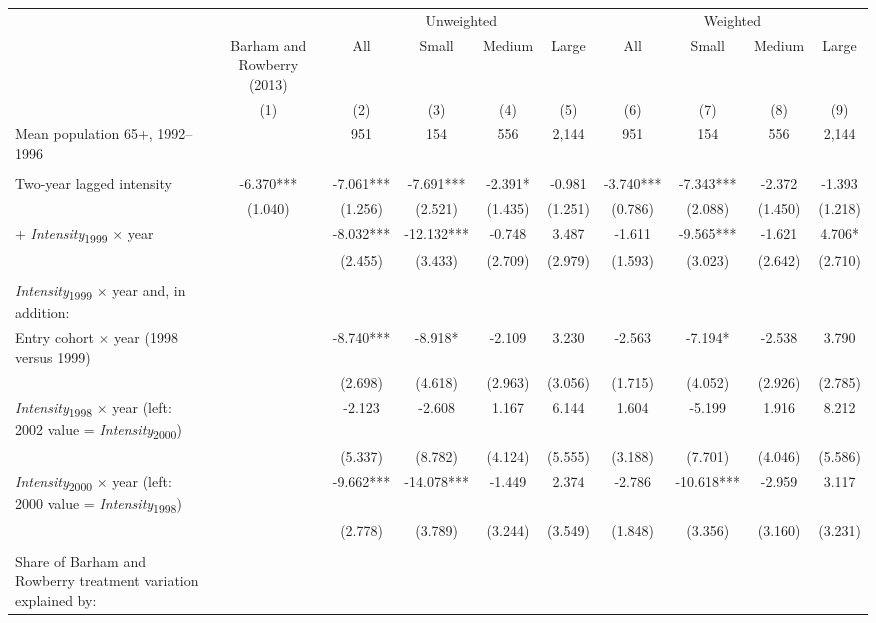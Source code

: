 \begin{tabular}{lccccccccc} \hline \hline
 & & \multicolumn{4}{c}{Unweighted} & \multicolumn{4}{c}{Weighted} \\ \cmidrule(lr){3-6} \cmidrule(lr){7-10}
 & Barham and Rowberry (2013) & All & Small & Medium & Large & All & Small & Medium & Large \\ 
 & (1) & (2) & (3) & (4) & (5) & (6) & (7) & (8) & (9) \\ \toprule
Mean population 65+, 1992--1996 & & 951 & 154 & 556 & 2,144 & 951 & 154 & 556 & 2,144 \\ 
  & & & & & & & & & \\ 
Two-year lagged intensity & -6.370*** & -7.061*** & -7.691*** & -2.391* & -0.981 & -3.740*** & -7.343*** & -2.372 & -1.393 \\ 
 & (1.040) & (1.256) & (2.521) & (1.435) & (1.251) & (0.786) & (2.088) & (1.450) & (1.218) \\ 
\quad + \textit{Intensity}\textsubscript{1999} \(\times\) year &  & -8.032*** & -12.132*** & -0.748 & 3.487 & -1.611 & -9.565*** & -1.621 & 4.706* \\ 
 &  & (2.455) & (3.433) & (2.709) & (2.979) & (1.593) & (3.023) & (2.642) & (2.710) \\ 
  & & & & & & & & & \\ 
\textit{Intensity}\textsubscript{1999} \(\times\) year and, in addition: & & & & & & & & & \\ 
\quad Entry cohort \(\times\) year (1998 versus 1999) &  & -8.740*** & -8.918* & -2.109 & 3.230 & -2.563 & -7.194* & -2.538 & 3.790 \\ 
 &  & (2.698) & (4.618) & (2.963) & (3.056) & (1.715) & (4.052) & (2.926) & (2.785) \\ 
\quad \textit{Intensity}\textsubscript{1998} \(\times\) year (left: 2002 value = \textit{Intensity}\textsubscript{2000}) &  & -2.123 & -2.608 & 1.167 & 6.144 & 1.604 & -5.199 & 1.916 & 8.212 \\ 
 &  & (5.337) & (8.782) & (4.124) & (5.555) & (3.188) & (7.701) & (4.046) & (5.586) \\ 
\quad \textit{Intensity}\textsubscript{2000} \(\times\) year (left: 2000 value = \textit{Intensity}\textsubscript{1998}) &  & -9.662*** & -14.078*** & -1.449 & 2.374 & -2.786 & -10.618*** & -2.959 & 3.117 \\ 
 &  & (2.778) & (3.789) & (3.244) & (3.549) & (1.848) & (3.356) & (3.160) & (3.231) \\ 
  & & & & & & & & & \\ 
Share of Barham and Rowberry treatment variation explained by: & & & & & & & & & \\ 

\end{tabular}
